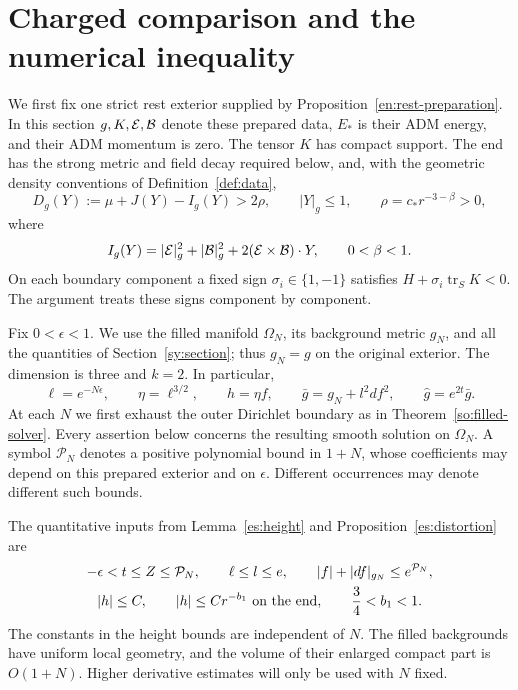 \section{Charged comparison and the numerical inequality}\label{cp:section}

We first fix one strict rest exterior supplied by
Proposition~\ref{en:rest-preparation}.  In this section $g,K,\mathcal E,\mathcal B$
denote these prepared data, $E_*$ is their ADM energy, and their ADM
momentum is zero.  The tensor $K$ has compact support.  The end has the
strong metric and field decay required below, and, with the geometric
density conventions of Definition~\ref{def:data},
\begin{equation}\label{cp:strict-margin}
 D_g(Y):=\mu+J(Y)-I_g(Y)>2\rho,
 \qquad |Y|_g\le1,\qquad \rho=c_*r^{-3-\beta}>0,
\end{equation}
where
\[
 I_g(Y)=|\mathcal E|_g^2+|\mathcal B|_g^2+2(\mathcal E\times\mathcal B)\cdot Y,
 \qquad 0<\beta<1.
\]
On each boundary component a fixed sign $\sigma_i\in\{1,-1\}$ satisfies
$H+\sigma_i\operatorname{tr}_S K<0$.  The argument treats these signs
component by component.

Fix $0<\epsilon<1$.  We use the filled manifold $\Omega_N$, its
background metric $g_N$, and all the quantities of
Section~\ref{sy:section}; thus $g_N=g$ on the original exterior.
The dimension is three and $k=2$.  In particular,
\begin{equation}\label{cp:parameters}
 \ell=e^{-N\epsilon},\qquad \eta=\ell^{3/2},\qquad h=\eta f,
 \qquad \bar g=g_N+l^2df^2,
 \qquad \widehat g=e^{2t}\bar g.
\end{equation}
At each $N$ we first exhaust the outer Dirichlet boundary as in
Theorem~\ref{so:filled-solver}.  Every assertion below concerns the
resulting smooth solution on $\Omega_N$.  A symbol $\mathcal P_N$
denotes a positive polynomial bound in $1+N$, whose coefficients may
depend on this prepared exterior and on $\epsilon$.  Different
occurrences may denote different such bounds.

The quantitative inputs from Lemma~\ref{es:height} and
Proposition~\ref{es:distortion} are
\begin{equation}\label{cp:quantitative-inputs}
 \begin{gathered}
 -\epsilon<t\le Z\le\mathcal P_N,\qquad
 \ell\le l\le e,\qquad
 |f|+|df|_{g_N}\le e^{\mathcal P_N},\\
 |h|\le C,\qquad |h|\le Cr^{-b_1}\ \hbox{on the end},
 \qquad \frac34<b_1<1.
 \end{gathered}
\end{equation}
The constants in the height bounds are independent of $N$.
The filled backgrounds have uniform local geometry, and the volume of
their enlarged compact part is $O(1+N)$.  Higher derivative estimates
will only be used with $N$ fixed.

